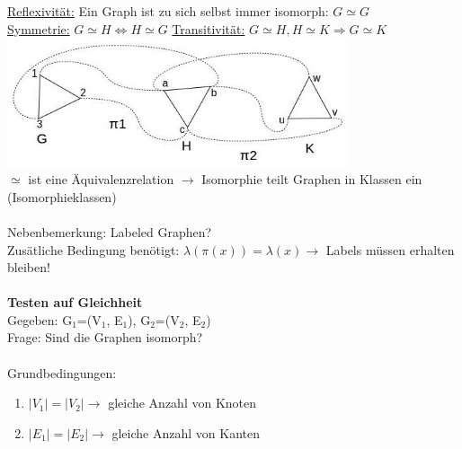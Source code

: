 \underline{Reflexivität:} Ein Graph ist zu sich selbst immer isomorph: $G \simeq G$\\
\underline{Symmetrie:} $G \simeq H \Leftrightarrow H \simeq G$
\underline{Transitivität:} $G \simeq H, H \simeq K \Rightarrow G \simeq K$\\
\includegraphics[width=0.75\textwidth]{lectures/161014/pix/7.jpg}
\\
$\simeq$ ist eine Äquivalenzrelation $\rightarrow$ Isomorphie teilt Graphen in Klassen ein (Isomorphieklassen)
\\\\
Nebenbemerkung: Labeled Graphen?\\
Zusätliche Bedingung benötigt: $\lambda(\pi(x))=\lambda(x) \rightarrow$ Labels müssen erhalten bleiben!
\\\\
\textbf{Testen auf Gleichheit}\\
Gegeben: G$_1$=(V$_1$, E$_1$), G$_2$=(V$_2$, E$_2$)\\
Frage: Sind die Graphen isomorph?
\\\\
Grundbedingungen:
\begin{enumerate}
	\item $|V_1| = |V_2| \rightarrow$ gleiche Anzahl von Knoten
	\item $|E_1| = |E_2| \rightarrow$ gleiche Anzahl von Kanten
\end{enumerate}

